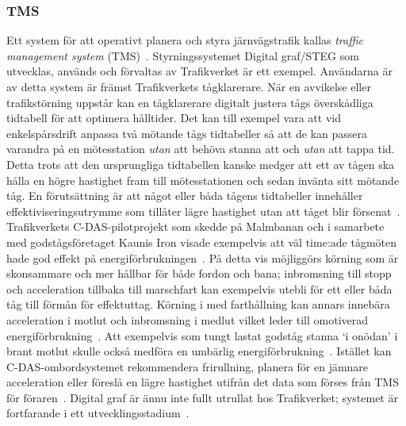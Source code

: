 \subsubsection{TMS}
Ett system för att operativt planera och styra järnvägstrafik kallas \emph{traffic management system} (TMS)~\cite{Joborn2023}.
Styrningssystemet Digital graf/STEG som utvecklas, används och förvaltas av Trafikverket är ett exempel.
Användarna är av detta system är främst Trafikverkets tågklarerare.
När en avvikelse eller trafikstörning uppstår kan en tågklarerare digitalt justera tågs överskådliga tidtabell för att optimera hålltider.
Det kan till exempel vara att vid enkelspårsdrift anpassa två mötande tågs tidtabeller så att de kan passera varandra på en mötesstation \emph{utan} att behöva stanna att och \emph{utan} att tappa tid.
Detta trots att den ursprungliga tidtabellen kanske medger att ett av tågen ska hålla en högre hastighet fram till mötesstationen och sedan invänta sitt mötande tåg.
En förutsättning är att något eller båda tågens tidtabeller innehåller effektiviseringsutrymme som tillåter lägre hastighet utan att tåget blir försenat~\cite{Joborn2023}.
Trafikverkets C-DAS-pilotprojekt som skedde på Malmbanan och i samarbete med godstågsföretaget Kaunis Iron visade exempelvis att väl time:ade tågmöten hade god effekt på energiförbrukningen~\cite{Lindmark2022}.
På detta vis möjliggörs körning som är skonsammare och mer hållbar för både fordon och bana; inbromsning till stopp och acceleration tillbaka till marschfart kan exempelvis utebli för ett eller båda tåg till förmån för effektuttag.
Körning i med farthållning kan annars innebära acceleration i motlut och inbromsning i medlut vilket leder till omotiverad energiförbrukning~\cite{Lindmark2022}.
Att exempelvis som tungt lastat godståg stanna \lq{}i onödan\rq{} i brant motlut skulle också medföra en umbärlig energiförbrukning~\cite{Lindmark2022}.
Istället kan C-DAS-ombordsystemet rekommendera frirullning, planera för en jämnare acceleration eller föreslå en lägre hastighet utifrån det data som förses från TMS för föraren~\cite{Lindmark2022}.
Digital graf är ännu inte fullt utrullat hos Trafikverket; systemet är fortfarande i ett utvecklingsstadium~\cite{Joborn2023}.
